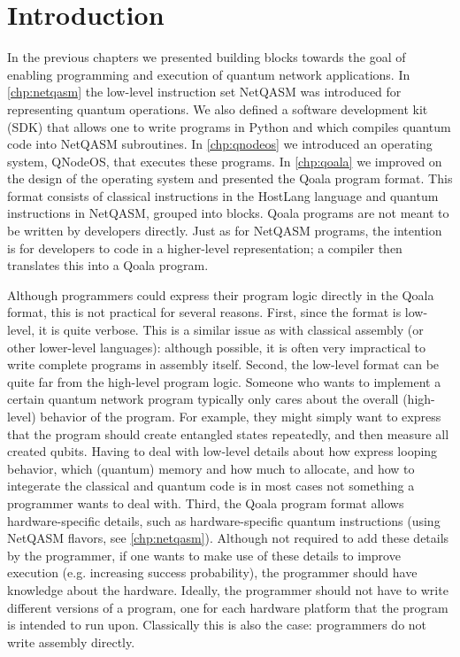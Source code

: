 \section{Introduction}
In the previous chapters we presented building blocks towards the goal of enabling programming and execution of quantum network applications.
In \cref{chp:netqasm} the low-level instruction set NetQASM was introduced for representing quantum operations.
We also defined a software development kit (SDK) that allows one to write programs in Python and which compiles quantum code into NetQASM subroutines.
In \cref{chp:qnodeos} we introduced an operating system, QNodeOS, that executes these programs.
In \cref{chp:qoala} we improved on the design of the operating system and presented the Qoala program format.
This format consists of classical instructions in the HostLang language and quantum instructions in NetQASM, grouped into blocks.
Qoala programs are not meant to be written by developers directly.
Just as for NetQASM programs, the intention is for developers to code in a higher-level representation; a compiler then translates this into a Qoala program.

Although programmers could express their program logic directly in the Qoala format, this is not practical for several reasons.
First, since the format is low-level, it is quite verbose.
This is a similar issue as with classical assembly (or other lower-level languages): although possible, it is often very impractical to write complete programs in assembly itself.
Second, the low-level format can be quite far from the high-level program logic.
Someone who wants to implement a certain quantum network program typically only cares about the overall (high-level) behavior of the program.
For example, they might simply want to express that the program should create entangled states repeatedly, and then measure all created qubits.
Having to deal with low-level details about how express looping behavior, which (quantum) memory and how much to allocate, and how to integerate the classical and quantum code
is in most cases not something a programmer wants to deal with. 
Third, the Qoala program format allows hardware-specific details, such as hardware-specific quantum instructions (using NetQASM flavors, see \cref{chp:netqasm}).
Although not required to add these details by the programmer, if one wants to make use of these details to improve execution (e.g. increasing success probability), the programmer should have knowledge about the hardware.
Ideally, the programmer should not have to write different versions of a program, one for each hardware platform that the program is intended to run upon.
Classically this is also the case: programmers do not write assembly directly.

